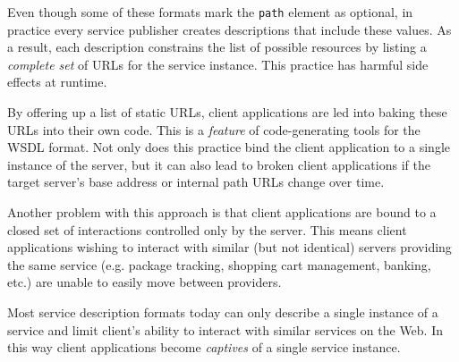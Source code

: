 \documentclass{wsrest2014}
\begin{document}
 \par{}Even though some of these formats mark the \texttt{path} element as optional, in practice every service publisher creates descriptions that include these values. As a result, each description constrains the list of possible resources by listing a \emph{complete set} of URLs for the service instance. This practice has harmful side effects at runtime.
 \par{}By offering up a list of static URLs, client applications are led into baking these URLs into their own code. This is a \emph{feature} of code-generating tools for the WSDL format. Not only does this practice bind the client application to a single instance of the server, but it can also lead to broken client applications if the target server's base address or internal path URLs change over time.
 \par{}Another problem with this approach is that client applications are bound to a closed set of interactions controlled only by the server. This means client applications wishing to interact with similar (but not identical) servers providing the same service (e.g. package tracking, shopping cart management, banking, etc.) are unable to easily move between providers.
 \par{}Most service description formats today can only describe a single instance of a service and limit client's ability to interact with similar services on the Web. In this way client applications become \emph{captives} of a single service instance.
\hypertarget{_specifying_protocol}{}
\end{document}
